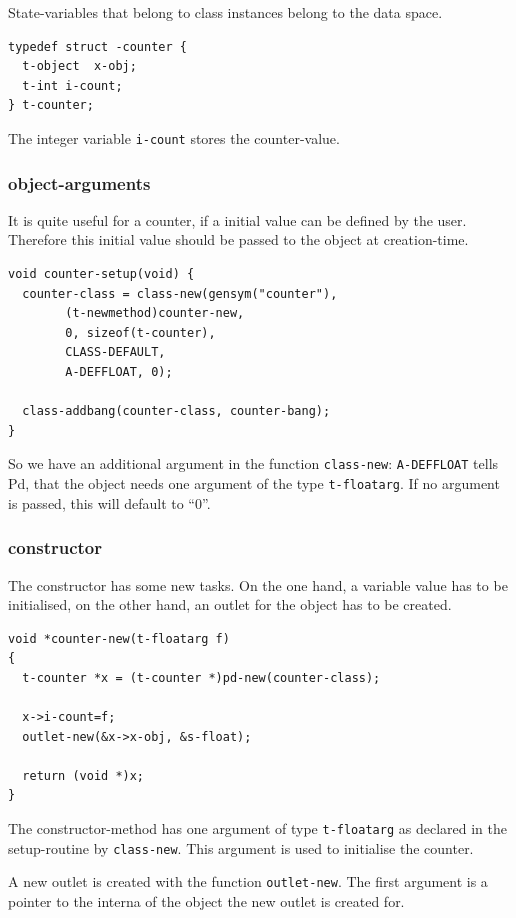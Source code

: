 \documentclass[draft]{ppgmus}
\begin{document}
State-variables that belong to class instances belong to the data space.

\begin{verbatim}
typedef struct -counter {
  t-object  x-obj;
  t-int i-count;
} t-counter;
\end{verbatim}

The integer variable \verb+i-count+ stores the counter-value.

\subsubsection{object-arguments}
It is quite useful for a counter, if a initial value can be defined by the user.
Therefore this initial value should be passed to the object at creation-time.

\begin{verbatim}
void counter-setup(void) {
  counter-class = class-new(gensym("counter"),
        (t-newmethod)counter-new,
        0, sizeof(t-counter),
        CLASS-DEFAULT,
        A-DEFFLOAT, 0);

  class-addbang(counter-class, counter-bang);
}
\end{verbatim}

So we have an additional argument in the function \verb+class-new+:
\verb+A-DEFFLOAT+ tells Pd, that the object needs one argument of the 
type \verb+t-floatarg+.
If no argument is passed, this will default to ``0''.

\subsubsection{constructor}
The constructor has some new tasks.
On the one hand, a variable value has to be initialised,
on the other hand, an outlet for the object has to be created.

\begin{verbatim}
void *counter-new(t-floatarg f)
{
  t-counter *x = (t-counter *)pd-new(counter-class);

  x->i-count=f;
  outlet-new(&x->x-obj, &s-float);

  return (void *)x;
}
\end{verbatim}

The constructor-method has one argument of type \verb+t-floatarg+ as declared
in the setup-routine by \verb+class-new+.
This argument is used to initialise the counter.

A new outlet is created with the function \verb+outlet-new+.
The first argument is a pointer to the interna of the object
the new outlet is created for.
\end{document}
